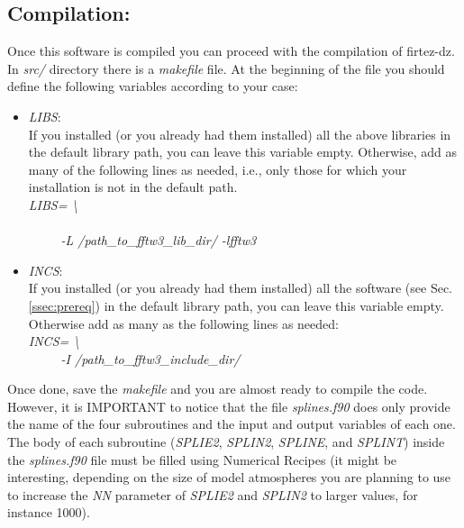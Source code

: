 \subsection{Compilation:}
Once this software is compiled you can proceed with the compilation of firtez-dz. In {\it src/} directory there is a {\it makefile} file. At the beginning of the file you should define the following variables according to your case:\\
\begin{itemize}
  \item {\it LIBS}:\\
  If you installed (or you already had them installed) all the above libraries in the default library path, you can leave this variable empty. Otherwise, add as many of the following lines as needed, i.e., only those for which your installation is not in the default path.\\
  {\it LIBS= \textbackslash}\\
  \hspace{10mm}{\it -L /path\_to\_lapack\_lib\_dir/ -llapack -lblas \textbackslash}\\
  {\it \ \ \ \ \ -L /path\_to\_fftw3\_lib\_dir/ -lfftw3}\\
  \item {\it INCS}:\\
  If you installed (or you already had them installed) all the software (see Sec. \ref{ssec:prereq}) in the default library path, you can leave this variable empty. Otherwise add as many as the following lines as needed:\\
  {\it INCS= \textbackslash}\\
  {\it \ \ \ \ \ -I /path\_to\_fftw3\_include\_dir/}\\
\end{itemize}
%
Once done, save the {\it makefile} and you are almost ready to compile the code.\\

However, it is IMPORTANT to notice that the file {\it splines.f90} does only provide the name of the four subroutines and the input and output variables of each one. The body of each subroutine ({\it SPLIE2}, {\it SPLIN2}, {\it SPLINE}, and {\it SPLINT}) inside the {\it splines.f90} file must be filled using Numerical Recipes (it might be interesting, depending on the size of model atmospheres you are planning to use to increase the {\it NN} parameter of {\it SPLIE2} and {\it SPLIN2} to larger values, for instance 1000).\\

